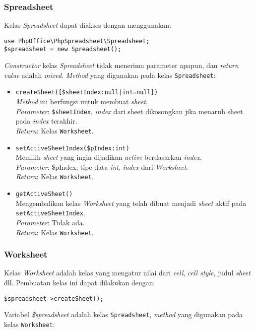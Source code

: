 \subsubsection{Spreadsheet}
	Kelas \textit{Spreadsheet} dapat diakses dengan menggunakan: 
	\begin{lstlisting}
use PhpOffice\PhpSpreadsheet\Spreadsheet;
$spreadsheet = new Spreadsheet();
	\end{lstlisting} 
	\textit{Constructor} kelas \textit{Spreadsheet} tidak menerima parameter apapun, dan \textit{return value} adalah \textit{mixed}. \textit{Method} yang digunakan pada kelas \texttt{Spreadsheet}:  
 \begin{itemize}
 	\item \texttt{createSheet([\$sheetIndex:null|int=null])} \\ 
 	\textit{Method} ini berfungsi untuk membuat \textit{sheet}.\\
 	\textit{Parameter}: \texttt{\$sheetIndex}, \textit{index} dari sheet dikosongkan jika menaruh sheet pada \textit{index} terakhir. \\ 
 	\textit{Return}: Kelas \texttt{Worksheet}.
 	
 	\item \texttt{setActiveSheetIndex(\$pIndex:int)}\\ Memilih \textit{sheet} yang ingin dijadikan \textit{active} berdasarkan \textit{index}. \\
 	\textit{Parameter}: \$pIndex, tipe data \textit{int}, \textit{index} dari \textit{Worksheet}. \\
 	\textit{Return}: Kelas \texttt{Worksheet}.
 	
 	\item \texttt{getActiveSheet()}\\
 	Mengembalikan kelas \textit{Worksheet} yang telah dibuat menjadi \textit{sheet} aktif pada \texttt{setActiveSheetIndex}.\\
 	\textit{Parameter}: Tidak ada. \\ 
 	\textit{Return}: Kelas \texttt{Worksheet}.
 \end{itemize}

\subsubsection{Worksheet}
Kelas \textit{Worksheet} adalah kelas yang mengatur nilai dari \textit{cell}, \textit{cell style}, judul \textit{sheet} dll. Pembuatan kelas ini dapat dilakukan dengan:
\begin{lstlisting}
$spreadsheet->createSheet();
\end{lstlisting}
Variabel \textit{\$spreadsheet} adalah kelas \texttt{Spreadsheet}, \textit{method} yang digunakan pada kelas \texttt{Worksheet}:

